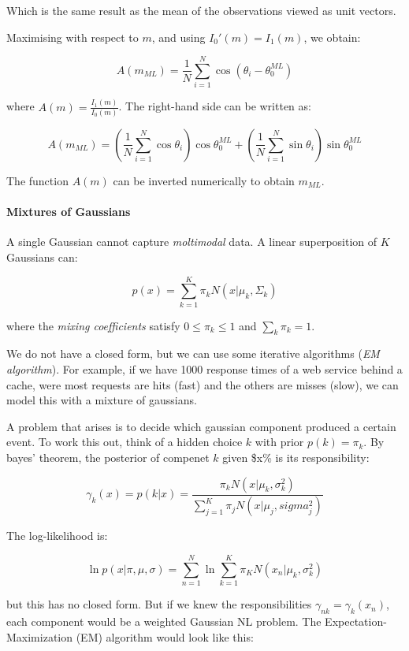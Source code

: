 \documentclass{article}
\begin{document}
Which is the same result as the mean of the observations viewed as unit
vectors.

Maximising with respect to \(m\), and using \(I_0'(m) = I_1(m)\), we
obtain:

\[A(m_{ML}) = \frac{1}{N} \sum_{i=1}^N \cos (\theta_i - \theta_0^{ML})\]

where \(A(m) = \frac{I_1 (m)}{I_0 (m)}\). The right-hand side can be
written as:

\[A(m_{ML}) = (\frac{1}{N}\sum_{i=1}^N \cos \theta_i) \cos \theta_0^{ML} +
(\frac{1}{N} \sum_{i=1}^N \sin \theta_i) \sin \theta_0^{ML}\]

The function \(A(m)\) can be inverted numerically to obtain \(m_{ML}\).

\paragraph{Mixtures of Gaussians}\label{mixtures-of-gaussians}

A single Gaussian cannot capture \emph{moltimodal} data. A linear
superposition of \(K\) Gaussians can:

\[p(x) = \sum_{k=1}^K \pi_k N(x | \mu_k, \Sigma_k)\]

where the \emph{mixing coefficients} satisfy \(0 \le \pi_k \le 1\) and
\(\sum_k \pi_k =
1\).

We do not have a closed form, but we can use some iterative algorithms
(\emph{EM algorithm}). For example, if we have 1000 response times of a
web service behind a cache, were most requests are hits (fast) and the
others are misses (slow), we can model this with a mixture of gaussians.

A problem that arises is to decide which gaussian component produced a
certain event. To work this out, think of a hidden choice \(k\) with
prior \(p(k) = \pi_k\). By bayes' theorem, the posterior of compenet
\(k\) given \$x\% is its responsibility:

\[\gamma_k (x) = p(k | x) = \frac{\pi_k N(x | \mu_k, \sigma^2_k)}{\sum_{j=1}^K
\pi_j N(x | \mu_j, sigma^2_j)}\]

The log-likelihood is:

\[\ln p(x | \pi, \mu, \sigma) = \sum_{n=1}^N \ln \sum_{k=1}^K \pi_K N(x_n |
\mu_k, \sigma^2_k)\]

but this has no closed form. But if we knew the responsibilities
\(\gamma_{nk} =
\gamma_k (x_n)\), each component would be a weighted Gaussian NL
problem. The Expectation-Maximization (EM) algorithm would look like
this:
\end{document}
